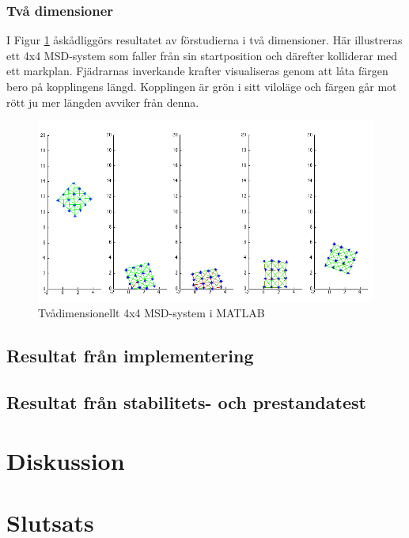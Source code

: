 \documentclass[a4paper,12pt,oneside,final,swedish]{extarticle}
\begin{document}
\subsubsection{Två dimensioner}
I Figur \ref{tvådim} åskådliggörs resultatet av förstudierna i två dimensioner. 
Här illustreras ett 4x4 MSD-system som faller från sin startposition och därefter kolliderar med ett markplan.
Fjädrarnas inverkande krafter visualiseras genom att låta färgen bero på kopplingens längd. 
Kopplingen är grön i sitt viloläge och färgen går mot rött ju mer längden avviker från denna.

\begin{figure}[h!]
  \begin{center}
    \includegraphics[width=16cm]{Bilder/boing.png} 
  \end{center}
  \caption{Tvådimensionellt 4x4 MSD-system i MATLAB}
  \label{tvådim}
\end{figure}

\subsection{Resultat från implementering}
\subsection{Resultat från stabilitets- och prestandatest}

\section{Diskussion}


\section{Slutsats}
\end{document}
